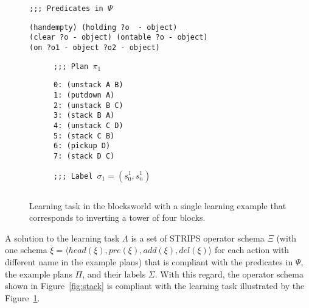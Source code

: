 \documentclass[letterpaper]{article} %
\newcommand{\tup}[1]{{\langle #1 \rangle}}
\begin{document}
\begin{figure}[hbt]
\begin{small}
{\tt ;;; Predicates in $\Psi$}
\begin{verbatim}
(handempty) (holding ?o  - object)
(clear ?o - object) (ontable ?o - object) 
(on ?o1 - object ?o2 - object)  
\end{verbatim}
\end{small}

\vspace{0.5cm}

\begin{subfigure}{.25\textwidth}
\begin{small}
{\tt ;;; Plan $\pi_1$}
\begin{verbatim}
0: (unstack A B)
1: (putdown A)
2: (unstack B C)
3: (stack B A)
4: (unstack C D)
5: (stack C B)
6: (pickup D)
7: (stack D C)
\end{verbatim}
\end{small}
\end{subfigure}%
\begin{subfigure}{.6\textwidth}
{\small\tt ;;; Label $\sigma_1=(s_0^1,s_{n}^1)$}
\begin{lstlisting}[mathescape]
\end{lstlisting}
\vspace{0.1cm}
\vspace{0.6cm}
\end{subfigure}%

 \caption{\small Learning task in the blocksworld with a single learning example that corresponds to inverting a tower of four blocks.}
\label{fig:lexample}
\end{figure}

A solution to the learning task $\Lambda$ is a set of STRIPS operator schema $\Xi$ (with one schema $\xi=\tup{head(\xi),pre(\xi),add(\xi),del(\xi)}$ for each action with different name in the example plans) that is compliant with the predicates in $\Psi$, the example plans $\Pi$, and their labels $\Sigma$. With this regard, the operator schema shown in Figure~\ref{fig:stack} is compliant with the learning task illustrated by the Figure~\ref{fig:lexample}.
\end{document}
